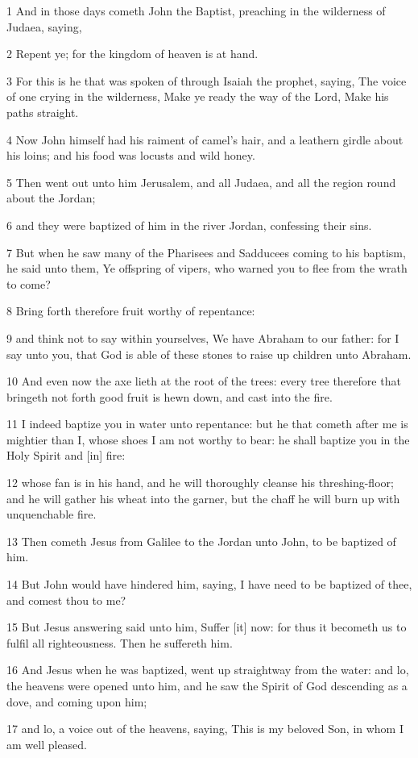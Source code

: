 \par 1 And in those days cometh John the Baptist, preaching in the wilderness of Judaea, saying,
\par 2 Repent ye; for the kingdom of heaven is at hand.
\par 3 For this is he that was spoken of through Isaiah the prophet, saying, The voice of one crying in the wilderness, Make ye ready the way of the Lord, Make his paths straight.
\par 4 Now John himself had his raiment of camel's hair, and a leathern girdle about his loins; and his food was locusts and wild honey.
\par 5 Then went out unto him Jerusalem, and all Judaea, and all the region round about the Jordan;
\par 6 and they were baptized of him in the river Jordan, confessing their sins.
\par 7 But when he saw many of the Pharisees and Sadducees coming to his baptism, he said unto them, Ye offspring of vipers, who warned you to flee from the wrath to come?
\par 8 Bring forth therefore fruit worthy of repentance:
\par 9 and think not to say within yourselves, We have Abraham to our father: for I say unto you, that God is able of these stones to raise up children unto Abraham.
\par 10 And even now the axe lieth at the root of the trees: every tree therefore that bringeth not forth good fruit is hewn down, and cast into the fire.
\par 11 I indeed baptize you in water unto repentance: but he that cometh after me is mightier than I, whose shoes I am not worthy to bear: he shall baptize you in the Holy Spirit and [in] fire:
\par 12 whose fan is in his hand, and he will thoroughly cleanse his threshing-floor; and he will gather his wheat into the garner, but the chaff he will burn up with unquenchable fire.
\par 13 Then cometh Jesus from Galilee to the Jordan unto John, to be baptized of him.
\par 14 But John would have hindered him, saying, I have need to be baptized of thee, and comest thou to me?
\par 15 But Jesus answering said unto him, Suffer [it] now: for thus it becometh us to fulfil all righteousness. Then he suffereth him.
\par 16 And Jesus when he was baptized, went up straightway from the water: and lo, the heavens were opened unto him, and he saw the Spirit of God descending as a dove, and coming upon him;
\par 17 and lo, a voice out of the heavens, saying, This is my beloved Son, in whom I am well pleased.

